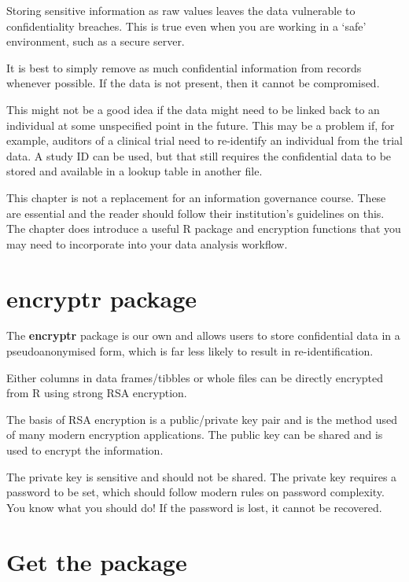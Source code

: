 \documentclass[
  12pt,
  krantz2]{krantz}
\begin{document}
Storing sensitive information as raw values leaves the data vulnerable to confidentiality breaches.
This is true even when you are working in a `safe' environment, such as a secure server.

It is best to simply remove as much confidential information from records whenever possible.
If the data is not present, then it cannot be compromised.

This might not be a good idea if the data might need to be linked back to an individual at some unspecified point in the future.
This may be a problem if, for example, auditors of a clinical trial need to re-identify an individual from the trial data.
A study ID can be used, but that still requires the confidential data to be stored and available in a lookup table in another file.

This chapter is not a replacement for an information governance course.
These are essential and the reader should follow their institution's guidelines on this.
The chapter does introduce a useful R package and encryption functions that you may need to incorporate into your data analysis workflow.

\hypertarget{encryptr-package}{%
\section{\texorpdfstring{\textbf{encryptr} package}{encryptr package}}\label{encryptr-package}}


The \textbf{encryptr} package is our own and allows users to store confidential data in a pseudoanonymised form, which is far less likely to result in re-identification.

Either columns in data frames/tibbles or whole files can be directly encrypted from R using strong RSA encryption.

The basis of RSA encryption is a public/private key pair and is the method used of many modern encryption applications.
The public key can be shared and is used to encrypt the information.

The private key is sensitive and should not be shared.
The private key requires a password to be set, which should follow modern rules on password complexity.
You know what you should do!
If the password is lost, it cannot be recovered.

\hypertarget{get-the-package}{%
\section{Get the package}\label{get-the-package}}
\end{document}
